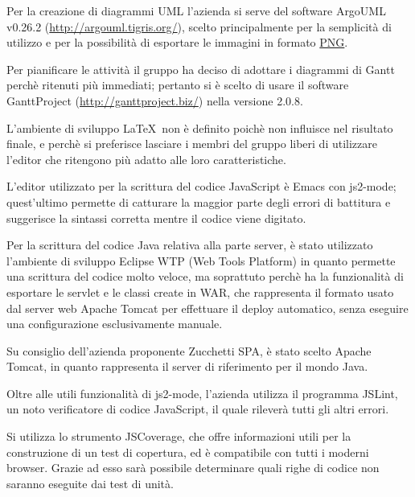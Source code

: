 Per la creazione di diagrammi UML l'azienda si serve del software ArgoUML v0.26.2 (\href{http://argouml.tigris.org/}{http://argouml.tigris.org/}), scelto principalmente per la semplicit\`a di utilizzo e per la possibilit\`a di esportare le immagini in formato \underline{PNG}.
 
Per pianificare le attivit\`a il gruppo ha deciso di adottare i diagrammi di Gantt perch\`e ritenuti pi\`u immediati; pertanto si \`e scelto di usare il software GanttProject (\href{http://ganttproject.biz/}{http://ganttproject.biz/}) nella versione 2.0.8.
 
L'ambiente di sviluppo \LaTeX \ non \`e definito poich\`e non influisce nel risultato finale, e perch\`e si preferisce lasciare i membri del gruppo liberi di utilizzare l'editor che ritengono pi\`u adatto alle loro caratteristiche.
 
L'editor utilizzato per la scrittura del codice JavaScript \`e Emacs con js2-mode; quest'ultimo permette di catturare la maggior parte degli errori di battitura e suggerisce la sintassi corretta mentre il codice viene digitato. 
 
Per la scrittura del codice Java relativa alla parte server, \`e stato utilizzato l'ambiente di sviluppo Eclipse WTP (Web Tools Platform) in quanto permette una scrittura del codice molto veloce, ma soprattuto perch\`e ha la funzionalit\`a di esportare le servlet e le classi create in WAR, che rappresenta il formato usato dal server web Apache Tomcat per effettuare il deploy automatico, senza eseguire una configurazione esclusivamente manuale.

Su consiglio dell'azienda proponente Zucchetti SPA, \`e stato scelto Apache Tomcat, in quanto rappresenta il server di riferimento per il mondo Java.


Oltre alle utili funzionalit\`a di js2-mode, l'azienda utilizza il programma JSLint, un noto verificatore di codice JavaScript, il quale rilever\`a tutti gli altri errori.

Si utilizza lo strumento JSCoverage, che offre informazioni utili per la construzione di un test di copertura, ed \`e compatibile con tutti i moderni browser. Grazie ad esso sar\`a possibile determinare quali righe di codice non saranno eseguite dai test di unit\`a.

